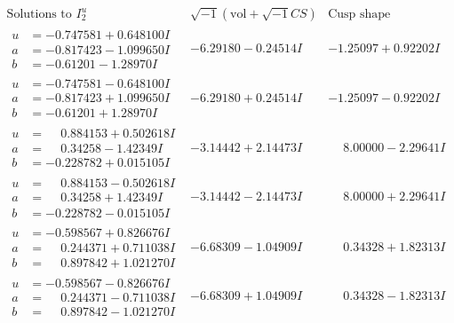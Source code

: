 \documentclass[1p]{elsarticle_modified}
\theoremstyle{definition}
\newcommand{\I}{\sqrt{-1}}
\begin{document}
$$\begin{array}{c|c|c}  
\text{Solutions to }I^u_{2}& \I (\text{vol} + \sqrt{-1}CS) & \text{Cusp shape}\\
 \hline 
\begin{aligned}
u &= -0.747581 + 0.648100 I \\
a &= -0.817423 - 1.099650 I \\
b &= -0.61201 - 1.28970 I\end{aligned}
 & -6.29180 - 0.24514 I & -1.25097 + 0.92202 I \\ \hline\begin{aligned}
u &= -0.747581 - 0.648100 I \\
a &= -0.817423 + 1.099650 I \\
b &= -0.61201 + 1.28970 I\end{aligned}
 & -6.29180 + 0.24514 I & -1.25097 - 0.92202 I \\ \hline\begin{aligned}
u &= \phantom{-}0.884153 + 0.502618 I \\
a &= \phantom{-}0.34258 - 1.42349 I \\
b &= -0.228782 + 0.015105 I\end{aligned}
 & -3.14442 + 2.14473 I & \phantom{-}8.00000 - 2.29641 I \\ \hline\begin{aligned}
u &= \phantom{-}0.884153 - 0.502618 I \\
a &= \phantom{-}0.34258 + 1.42349 I \\
b &= -0.228782 - 0.015105 I\end{aligned}
 & -3.14442 - 2.14473 I & \phantom{-}8.00000 + 2.29641 I \\ \hline\begin{aligned}
u &= -0.598567 + 0.826676 I \\
a &= \phantom{-}0.244371 + 0.711038 I \\
b &= \phantom{-}0.897842 + 1.021270 I\end{aligned}
 & -6.68309 - 1.04909 I & \phantom{-}0.34328 + 1.82313 I \\ \hline\begin{aligned}
u &= -0.598567 - 0.826676 I \\
a &= \phantom{-}0.244371 - 0.711038 I \\
b &= \phantom{-}0.897842 - 1.021270 I\end{aligned}
 & -6.68309 + 1.04909 I & \phantom{-}0.34328 - 1.82313 I \\ \hline\begin{aligned}

\end{aligned}
\end{array}$$
\end{document}
